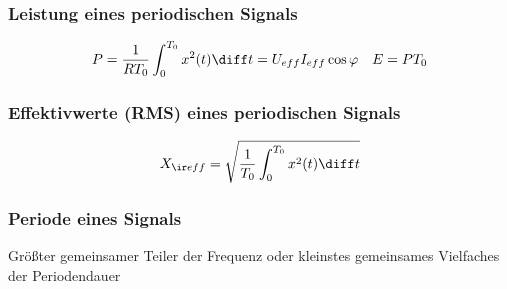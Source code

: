 \begin{sectionbox}
    \subsubsection{Leistung eines periodischen Signals}
    \begin{equation*}
        P=\frac{1}{RT_0}\int_0^{T_0}x^2(t)\diff t=U_{eff}I_{eff}\cos\varphi \quad E=PT_0
    \end{equation*}

    \subsubsection{Effektivwerte (RMS) eines periodischen Signals}
    \begin{equation*}
        X_{\ir eff} = \sqrt{\frac{1}{T_0}\int_0^{T_0}x^2(t)\diff t}
    \end{equation*}

    \subsubsection{Periode eines Signals}
    Größter gemeinsamer Teiler der Frequenz oder kleinstes gemeinsames Vielfaches der Periodendauer
\end{sectionbox}